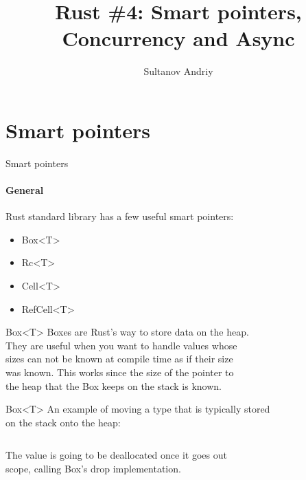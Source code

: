 \documentclass[usenames,dvipsnames,10pt,aspectratio=169]{beamer}
\title[Rust \#4]{Rust \#4: Smart pointers,\\ \vspace{0.1cm}Concurrency and Async}
\author[Sultanov Andriy]{Sultanov Andriy}
\institute{APPS@UCU}
\begin{document}
\begin{frame}
\titlepage
\end{frame}

\begin{frame}{\contentsname}
\tableofcontents
\end{frame}


\section{Smart pointers}

\begin{frame}{Smart pointers}
	\framesubtitle{General}
\large	
Rust standard library has a few useful smart pointers:
\vspace{0.4cm}
\begin{itemize}[label=$\bullet$]
	\item Box<T>
	\item Rc<T>
	\item Cell<T>
	\item RefCell<T>
\end{itemize}
\end{frame}

\begin{frame}{Box<T>}
	\large
	Boxes are Rust's way to store data on the heap.\\
	\vspace{0.4cm}
	They are useful when you want to handle values whose\\
	sizes can not be known at compile time as if their size\\
	was known. This works since the size of the pointer to\\
	the heap that the Box keeps on the stack is known.\\
\end{frame}

\begin{frame}{Box<T>}
	\large
	An example of moving a type that is typically stored\\
	on the stack onto the heap:
	\vspace{0.4cm}
	\inputminted[fontsize=\large]{rust}{code/box1.rs}
	\vspace{0.4cm}
	The value is going to be deallocated once it goes out\\
	scope, calling Box's \textcolor{ucuyellow}{drop} implementation.\\
\end{frame}
\end{document}
